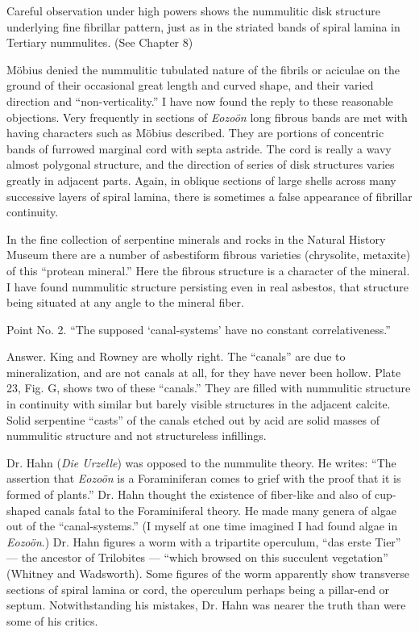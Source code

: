 \documentclass[a4paper, 12pt, oneside]{article}
\begin{document}
Careful observation under high powers shows the nummulitic disk structure underlying fine fibrillar pattern, just as in the striated bands of spiral lamina in Tertiary nummulites. (See Chapter 8)

Möbius denied the nummulitic tubulated nature of the fibrils or aciculae on the ground of their occasional great length and curved shape, and their varied direction and ``non-verticality.'' I have now found the reply to these reasonable objections. Very frequently in sections of \emph{Eozoön} long fibrous bands are met with having characters such as Möbius described. They are portions of concentric bands of furrowed marginal cord with septa astride. The cord is really a wavy almost polygonal structure, and the direction of series of disk structures varies greatly in adjacent parts. Again, in oblique sections of large shells across many successive layers of spiral lamina, there is sometimes a false appearance of fibrillar continuity.

In the fine collection of serpentine minerals and rocks in the Natural History Museum there are a number of asbestiform fibrous varieties (chrysolite, metaxite) of this ``protean mineral.'' Here the fibrous structure is a character of the mineral. I have found nummulitic structure persisting even in real asbestos, that structure being situated at any angle to the mineral fiber.

Point No. 2. ``The supposed `canal-systems' have no constant correlativeness.''

Answer. King and Rowney are wholly right. The ``canals'' are due to mineralization, and are not canals at all, for they have never been hollow. Plate 23, Fig. G, shows two of these ``canals.'' They are filled with nummulitic structure in continuity with similar but barely visible structures in the adjacent calcite. Solid serpentine ``casts'' of the canals etched out by acid are solid masses of nummulitic structure and not structureless infillings.

Dr. Hahn (\emph{Die Urzelle}) was opposed to the nummulite theory. He writes: ``The assertion that \emph{Eozoön} is a Foraminiferan comes to grief with the proof that it is formed of plants.'' Dr. Hahn thought the existence of fiber-like and also of cup-shaped canals fatal to the Foraminiferal theory. He made many genera of algae out of the ``canal-systems.'' (I myself at one time imagined I had found algae in \emph{Eozoön}.) Dr. Hahn figures a worm with a tripartite operculum, ``das erste Tier'' --- the ancestor of Trilobites --- ``which browsed on this succulent vegetation'' (Whitney and Wadsworth). Some figures of the worm apparently show transverse sections of spiral lamina or cord, the operculum perhaps being a pillar-end or septum. Notwithstanding his mistakes, Dr. Hahn was nearer the truth than were some of his critics.
\end{document}
